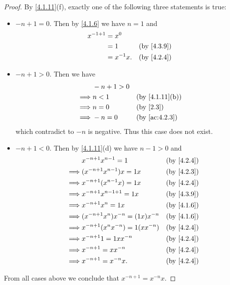 \begin{proof}
	By \cref{4.1.11}(f), exactly one of the following three statements is true:
	\begin{itemize}
		\item \(-n + 1 = 0\).
		      Then by \cref{4.1.6} we have \(n = 1\) and
		      \begin{align*}
			      x^{-1 + 1} & = x^0                       \\
			                 & = 1         &  & \by{4.3.9} \\
			                 & = x^{-1} x. &  & \by{4.2.4}
		      \end{align*}
		\item \(-n + 1 > 0\).
		      Then we have
		      \begin{align*}
			               & -n + 1 > 0                                   \\
			      \implies & n < 1      &  & \text{(by \cref{4.1.11}(b))} \\
			      \implies & n = 0      &  & \by{2.3}                     \\
			      \implies & -n = 0     &  & \by{ac:4.2.3}
		      \end{align*}
		      which contradict to \(-n\) is negative.
		      Thus this case does not exist.
		\item \(-n + 1 < 0\).
		      Then by \cref{4.1.11}(d) we have \(n - 1 > 0\) and
		      \begin{align*}
			               & x^{-n + 1} x^{n - 1} = 1              &  & \by{4.2.4} \\
			      \implies & (x^{-n + 1} x^{n - 1}) x = 1x         &  & \by{4.2.3} \\
			      \implies & x^{-n + 1} (x^{n - 1} x) = 1x         &  & \by{4.2.4} \\
			      \implies & x^{-n + 1} x^{n - 1 + 1} = 1x         &  & \by{4.3.9} \\
			      \implies & x^{-n + 1} x^n = 1x                   &  & \by{4.1.6} \\
			      \implies & (x^{-n + 1} x^n) x^{-n} = (1x) x^{-n} &  & \by{4.1.6} \\
			      \implies & x^{-n + 1} (x^n x^{-n}) = 1(x x^{-n}) &  & \by{4.2.4} \\
			      \implies & x^{-n + 1} 1 = 1x x^{-n}              &  & \by{4.2.4} \\
			      \implies & x^{-n + 1} = x x^{-n}                 &  & \by{4.2.4} \\
			      \implies & x^{-n + 1} = x^{-n} x.                &  & \by{4.2.4}
		      \end{align*}
	\end{itemize}
	From all cases above we conclude that \(x^{-n + 1} = x^{-n} x\).
\end{proof}

